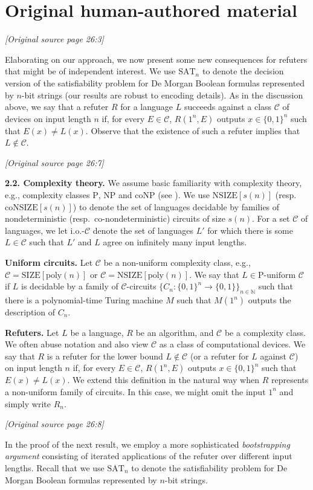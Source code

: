 \documentclass[11pt]{article}
\newcommand{\NP}{\mathrm{NP}}
\newcommand{\coNP}{\mathrm{coNP}}
\newcommand{\Pclass}{\mathrm{P}}
\newcommand{\SAT}{\mathrm{SAT}}
\newcommand{\SIZE}{\mathrm{SIZE}}
\newcommand{\NSIZE}{\mathrm{NSIZE}}
\newcommand{\coNSIZE}{\mathrm{coNSIZE}}
\newcommand{\poly}{\mathrm{poly}}
\newcommand{\sourcepage}[1]{\par\Needspace{5\baselineskip}\bigskip\noindent\textit{[Original source page 26:#1]}\par\medskip}
\begin{document}
\clearpage
\section*{Original human-authored material}
\sourcepage{3}
Elaborating on our approach, we now present some new consequences for refuters that might be of independent interest. We use $\SAT_n$ to denote the decision version of the satisfiability problem for De Morgan Boolean formulas represented by $n$-bit strings (our results are robust to encoding details). As in the discussion above, we say that a refuter $R$ for a language $L$ succeeds against a class $\mathcal C$ of devices on input length $n$ if, for every $E\in\mathcal C$, $R(1^n,E)$ outputs $x\in\{0,1\}^n$ such that $E(x)\ne L(x)$. Observe that the existence of such a refuter implies that $L\notin\mathcal C$.

\sourcepage{7}
\noindent\textbf{2.2. Complexity theory.} We assume basic familiarity with complexity theory, e.g., complexity classes $\Pclass$, $\NP$ and $\coNP$ (see \cite{AB09}). We use $\NSIZE[s(n)]$ (resp.\ $\coNSIZE[s(n)]$) to denote the set of languages decidable by families of nondeterministic (resp.\ co-nondeterministic) circuits of size $s(n)$. For a set $\mathcal C$ of languages, we let $\mathrm{i.o.}\text{-}\mathcal C$ denote the set of languages $L'$ for which there is some $L\in\mathcal C$ such that $L'$ and $L$ agree on infinitely many input lengths.

\noindent\textbf{Uniform circuits.} Let $\mathcal C$ be a non-uniform complexity class, e.g., $\mathcal C=\SIZE[\poly(n)]$ or $\mathcal C=\NSIZE[\poly(n)]$. We say that $L\in\Pclass\text{-uniform }\mathcal C$ if $L$ is decidable by a family of $\mathcal C$-circuits $\{C_n:\{0,1\}^n\to\{0,1\}\}_{n\in\mathbb N}$ such that there is a polynomial-time Turing machine $M$ such that $M(1^n)$ outputs the description of $C_n$.

\noindent\textbf{Refuters.} Let $L$ be a language, $R$ be an algorithm, and $\mathcal C$ be a complexity class. We often abuse notation and also view $\mathcal C$ as a class of computational devices. We say that $R$ is a refuter for the lower bound $L\notin\mathcal C$ (or a refuter for $L$ against $\mathcal C$) on input length $n$ if, for every $E\in\mathcal C$, $R(1^n,E)$ outputs $x\in\{0,1\}^n$ such that $E(x)\ne L(x)$. We extend this definition in the natural way when $R$ represents a non-uniform family of circuits. In this case, we might omit the input $1^n$ and simply write $R_n$.

\sourcepage{8}
In the proof of the next result, we employ a more sophisticated \emph{bootstrapping argument} consisting of iterated applications of the refuter over different input lengths. Recall that we use $\SAT_n$ to denote the satisfiability problem for De Morgan Boolean formulas represented by $n$-bit strings.
\end{document}
